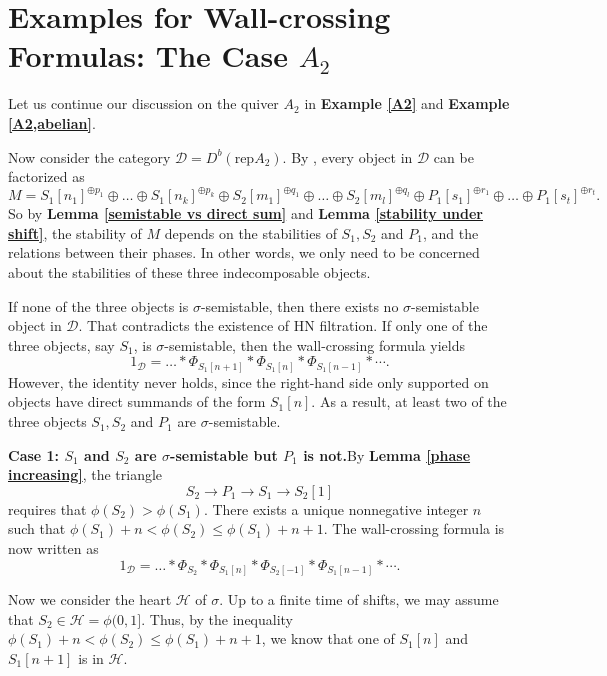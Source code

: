 \documentclass[a4paper,12pt]{amsart}
\newcommand{\rep}{\mathrm{rep}}
\begin{document}
\section{Examples for Wall-crossing Formulas: The Case $A_2$}
Let us continue our discussion on the quiver $A_2$ in \textbf{Example \ref{A2}} and \textbf{Example \ref{A2,abelian}}.

Now consider the category $\mathcal{D}=D^b(\rep A_2)$. By \cite{Hap1988}, every object in $\mathcal{D}$ can be factorized as
\[M=S_1[n_1]^{\oplus p_1}\oplus\dots\oplus S_1[n_k]^{\oplus p_k}\oplus S_2[m_1]^{\oplus q_1}\oplus\dots\oplus S_2[m_l]^{\oplus q_l}\oplus P_1[s_1]^{\oplus r_1}\oplus\dots\oplus P_1[s_t]^{\oplus r_t}.\]
So by \textbf{Lemma \ref{semistable vs direct sum}} and \textbf{Lemma \ref{stability under shift}}, the stability of $M$ depends on the stabilities of $S_1,S_2$ and $P_1$, and the relations between their phases. In other words, we only need to be concerned about the stabilities of these three indecomposable objects.

If none of the three objects is $\sigma$-semistable, then there exists no $\sigma$-semistable object in $\mathcal{D}$. That contradicts the existence of HN filtration. If only one of the three objects, say $S_1$, is $\sigma$-semistable, then the wall-crossing formula yields
\[1_\mathcal{D}=\dots*\Phi_{S_1[n+1]}*\Phi_{S_1[n]}*\Phi_{S_1[n-1]}*\cdots.\]
However, the identity never holds, since the right-hand side only supported on objects have direct summands of the form $S_1[n]$. As a result, at least two of the three objects $S_1,S_2$ and $P_1$ are $\sigma$-semistable.

\textbf{Case 1: $S_1$ and $S_2$ are $\sigma$-semistable but $P_1$ is not.}By \textbf{Lemma \ref{phase increasing}}, the triangle
\[S_2\rightarrow P_1\rightarrow S_1\rightarrow S_2[1]\]
requires that $\phi(S_2)>\phi(S_1)$. There exists a unique nonnegative integer $n$ such that $\phi(S_1)+n<\phi(S_2)\leqslant\phi(S_1)+n+1$. The wall-crossing formula is now written as
\begin{equation}\label{1}
    1_\mathcal{D}=\dots*\Phi_{S_2}*\Phi_{S_1[n]}*\Phi_{S_2[-1]}*\Phi_{S_1[n-1]}*\cdots.
\end{equation}

Now we consider the heart $\mathcal{H}$ of $\sigma$. Up to a finite time of shifts, we may assume that $S_2\in\mathcal{H}=\phi(0,1]$. Thus, by the inequality $\phi(S_1)+n<\phi(S_2)\leqslant\phi(S_1)+n+1$, we know that one of $S_1[n]$ and $S_1[n+1]$ is in $\mathcal{H}$.
\end{document}

